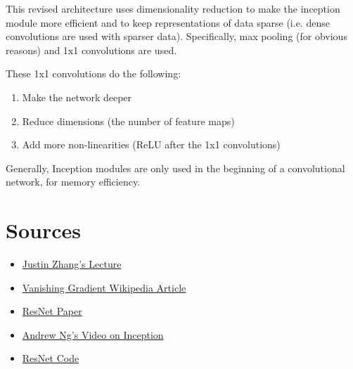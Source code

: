 \documentclass{article}
\begin{document}
    This revised architecture uses dimensionality reduction to make the inception module more efficient and to keep representations of data sparse (i.e. dense convolutions are used with sparser data). Specifically, max pooling (for obvious reasons) and 1x1 convolutions are used.
    
    These 1x1 convolutions do the following:
    \begin{enumerate}
        \item Make the network deeper
        \item Reduce dimensions (the number of feature maps)
        \item Add more non-linearities (ReLU after the 1x1 convolutions)
    \end{enumerate}
    
 Generally, Inception modules are only used in the beginning of a convolutional network, for memory efficiency. 
    
   
\section{Sources}
\begin{itemize}
	\item \href{https://tjmachinelearning.com/lectures/1718/deepconv/deepconv.pdf}{Justin Zhang's Lecture} 
	\item \href{https://en.wikipedia.org/wiki/Vanishing_gradient_problem}{Vanishing Gradient Wikipedia Article}
	\item \href{https://arxiv.org/pdf/1512.03385v1.pdf}{ResNet Paper}
 	\item \href{https://www.coursera.org/lecture/convolutional-neural-networks/inception-network-motivation-5WIZm}{Andrew Ng's Video on Inception}
	\item \href{https://github.com/pytorch/vision/blob/7c077f6a986f05383bcb86b535aedb5a63dd5c4b/torchvision/models/resnet.py#L118}{ResNet Code}
\end{itemize}
\end{document}
